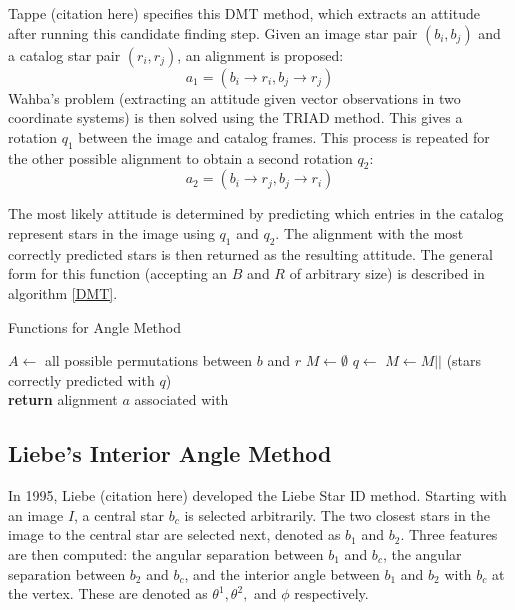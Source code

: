 Tappe (citation here) specifies this DMT method, which extracts an attitude after running this candidate finding step. Given an image star pair $(b_i, b_j)$ and a catalog star pair $(r_i, r_j)$, an alignment is proposed:
\begin{equation}
a_1 = (b_i \rightarrow r_i, b_j \rightarrow r_j)
\end{equation}
Wahba's problem (extracting an attitude given vector observations in two coordinate systems) is then solved using the TRIAD method. This gives a rotation $q_1$ between the image and catalog frames. This process is repeated for the other possible alignment to obtain a second rotation $q_2$:
\begin{equation}
a_2 = (b_i \rightarrow r_j, b_j \rightarrow r_i)
\end{equation}

The most likely attitude is determined by predicting which entries in the catalog represent stars in the image using $q_1$ and $q_2$. The alignment with the most correctly predicted stars is then returned as the resulting attitude. The general form for this function (accepting an $B$ and $R$ of arbitrary size) is described in algorithm \eqref{DMT}.

\begin{algorithm}
\caption{Functions for Angle Method}
\label{DMT}
\begin{algorithmic}[1]
\State $A \gets $ all possible permutations between $b$ and $r$
\State $M \gets \emptyset$
\State $q \gets $ 
\State $M \gets M ||$ (stars correctly predicted with $q$)
\EndFor
\\
\State \textbf{return} alignment $a$ associated with 
\EndFunction
\end{algorithmic}
\end{algorithm}

\subsection{Liebe's Interior Angle Method}
In 1995, Liebe (citation here) developed the Liebe Star ID method. Starting with an image $I$, a central star $b_c$ is selected arbitrarily. The two closest stars in the image to the central star are selected next, denoted as $b_1$ and $b_2$. Three features are then computed: the angular separation between $b_1$ and $b_c$, the angular separation between $b_2$ and $b_c$, and the interior angle between $b_1$ and $b_2$ with $b_c$ at the vertex. These are denoted as $\theta^1, \theta^2,$ and $\phi$ respectively. 


